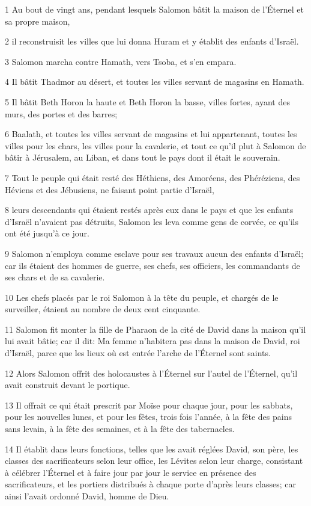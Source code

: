 \par 1 Au bout de vingt ans, pendant lesquels Salomon bâtit la maison de l'Éternel et sa propre maison,
\par 2 il reconstruisit les villes que lui donna Huram et y établit des enfants d'Israël.
\par 3 Salomon marcha contre Hamath, vers Tsoba, et s'en empara.
\par 4 Il bâtit Thadmor au désert, et toutes les villes servant de magasins en Hamath.
\par 5 Il bâtit Beth Horon la haute et Beth Horon la basse, villes fortes, ayant des murs, des portes et des barres;
\par 6 Baalath, et toutes les villes servant de magasins et lui appartenant, toutes les villes pour les chars, les villes pour la cavalerie, et tout ce qu'il plut à Salomon de bâtir à Jérusalem, au Liban, et dans tout le pays dont il était le souverain.
\par 7 Tout le peuple qui était resté des Héthiens, des Amoréens, des Phéréziens, des Héviens et des Jébusiens, ne faisant point partie d'Israël,
\par 8 leurs descendants qui étaient restés après eux dans le pays et que les enfants d'Israël n'avaient pas détruits, Salomon les leva comme gens de corvée, ce qu'ils ont été jusqu'à ce jour.
\par 9 Salomon n'employa comme esclave pour ses travaux aucun des enfants d'Israël; car ils étaient des hommes de guerre, ses chefs, ses officiers, les commandants de ses chars et de sa cavalerie.
\par 10 Les chefs placés par le roi Salomon à la tête du peuple, et chargés de le surveiller, étaient au nombre de deux cent cinquante.
\par 11 Salomon fit monter la fille de Pharaon de la cité de David dans la maison qu'il lui avait bâtie; car il dit: Ma femme n'habitera pas dans la maison de David, roi d'Israël, parce que les lieux où est entrée l'arche de l'Éternel sont saints.
\par 12 Alors Salomon offrit des holocaustes à l'Éternel sur l'autel de l'Éternel, qu'il avait construit devant le portique.
\par 13 Il offrait ce qui était prescrit par Moïse pour chaque jour, pour les sabbats, pour les nouvelles lunes, et pour les fêtes, trois fois l'année, à la fête des pains sans levain, à la fête des semaines, et à la fête des tabernacles.
\par 14 Il établit dans leurs fonctions, telles que les avait réglées David, son père, les classes des sacrificateurs selon leur office, les Lévites selon leur charge, consistant à célébrer l'Éternel et à faire jour par jour le service en présence des sacrificateurs, et les portiers distribués à chaque porte d'après leurs classes; car ainsi l'avait ordonné David, homme de Dieu.
